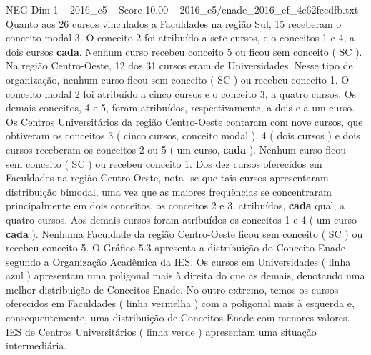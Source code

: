 \begin{textsample}{NEG Dim 1 – 2016\_c5 – Score 10.00 – 2016\_c5/enade\_2016\_ef\_4c62fccdfb.txt}
Quanto aos 26 cursos vinculados a Faculdades na região Sul, 15 receberam o conceito modal 3.
O conceito 2 foi atribuído a sete cursos, e o conceitos 1 e 4, a dois cursos \textbf{cada}.
Nenhum curso recebeu conceito 5 ou ficou sem conceito ( SC ).
Na região Centro-Oeste, 12 dos 31 cursos eram de Universidades.
Nesse tipo de organização, nenhum curso ficou sem conceito ( SC ) ou recebeu conceito 1.
O conceito modal 2 foi atribuído a cinco cursos e o conceito 3, a quatro cursos.
Os demais conceitos, 4 e 5, foram atribuídos, respectivamente, a dois e a um curso.
Os Centros Universitários da região Centro-Oeste contaram com nove cursos, que obtiveram os conceitos 3 ( cinco cursos, conceito modal ), 4 ( dois cursos ) e dois cursos receberam os conceitos 2 ou 5 ( um curso, \textbf{cada} ).
Nenhum curso ficou sem conceito ( SC ) ou recebeu conceito 1.
Dos dez cursos oferecidos em Faculdades na região Centro-Oeste, nota -se que tais cursos apresentaram distribuição bimodal, uma vez que as maiores frequências se concentraram principalmente em dois conceitos, os conceitos 2 e 3, atribuídos, \textbf{cada} qual, a quatro cursos.
Aos demais cursos foram atribuídos os conceitos 1 e 4 ( um curso \textbf{cada} ).
Nenhuma Faculdade da região Centro-Oeste ficou sem conceito ( SC ) ou recebeu conceito 5.
O Gráfico 5.3 apresenta a distribuição do Conceito Enade segundo a Organização Acadêmica da IES.
Os cursos em Universidades ( linha azul ) apresentam uma poligonal mais à direita do que as demais, denotando uma melhor distribuição de Conceitos Enade.
No outro extremo, temos os cursos oferecidos em Faculdades ( linha vermelha ) com a poligonal mais à esquerda e, consequentemente, uma distribuição de Conceitos Enade com menores valores.
IES de Centros Universitários ( linha verde ) apresentam uma situação intermediária.

\end{textsample}
